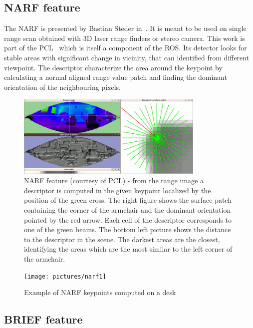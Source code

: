\subsection{NARF feature}

The \gls{NARF} is presented by Bastian Steder in~\cite{steder10irosws}. It is meant to be used on single range scan obtained with 3D laser range finders or stereo camera. This work is part of the \gls{PCL}~\cite{Rusu_ICRA2011_PCL} which is itself a component of the \gls{ROS}. Its detector looks for stable areas with significant change in vicinity, that can identified from different viewpoint. The descriptor characterize the area around the keypoint by calculating a normal aligned range value patch and finding the dominant orientation of the neighbouring pixels.

\begin{figure}[H]
\centering
\includegraphics[width=0.8\textwidth]{figures/narf_descriptor_visualization}
\caption{NARF feature (courtesy of PCL) - from the range image a descriptor is computed in the given keypoint localized by the position of the green cross. The right figure shows the surface patch containing the corner of the armchair and the dominant orientation pointed by the red arrow. Each cell of the descriptor corresponds to one of the green beams. The bottom left picture shows the distance to the descriptor in the scene. The darkest areas are the closest, identifying the areas which are the most similar to the left corner of the armchair.}
\end{figure}

\begin{figure}[H]
\centering
\texttt{[image: pictures/narf1]}
\caption{Example of NARF keypoints computed on a desk}
\end{figure}

\subsection{BRIEF feature}

